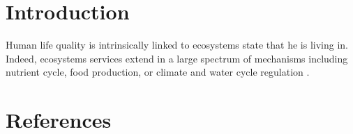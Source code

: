 \documentclass[
  12pt,
  oneside]{report}
\begin{document}
\hypertarget{intro}{%
\chapter{Introduction}\label{intro}}

Human life quality is intrinsically linked to ecosystems state that he is living in. Indeed, ecosystems
services extend in a large spectrum of mechanisms including nutrient cycle, food production, or
climate and water cycle regulation \autocite{pereira_global_2012}.


\singlespacing %
\chapter{References}\label{references}
{
\renewcommand{\clearpage}{}
\printbibliography[heading=none] %
}
\end{document}
